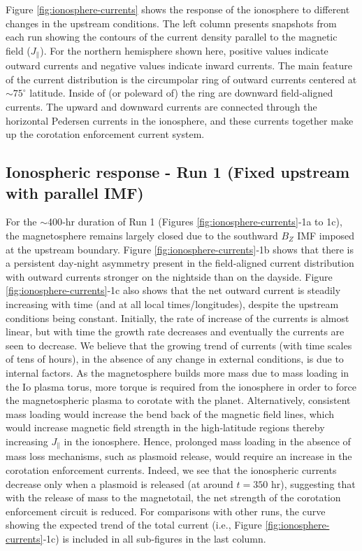 Figure \ref{fig:ionosphere-currents} shows the response of the ionosphere to different changes in the upstream conditions. The left column presents snapshots from each run showing the contours of the current density parallel to the magnetic field ($J_\parallel$). For the northern hemisphere shown here, positive values indicate outward currents and negative values indicate inward currents. The main feature of the current distribution is the circumpolar ring of outward currents centered at $\sim75^\circ$ latitude. Inside of (or poleward of) the ring are downward field‐aligned currents. The upward and downward currents are connected through the horizontal Pedersen currents in the ionosphere, and these currents together make up the corotation enforcement current system. 

\subsection{Ionospheric response - Run 1 (Fixed upstream with parallel IMF)}

For the $\sim$400‐hr duration of Run 1 (Figures \ref{fig:ionosphere-currents}‐1a to 1c), the magnetosphere remains largely closed due to the southward $B_Z$ IMF imposed at the upstream boundary. Figure \ref{fig:ionosphere-currents}‐1b shows that there is a persistent day‐night asymmetry present in the field‐aligned current distribution with outward currents stronger on the nightside than on the dayside. Figure \ref{fig:ionosphere-currents}‐1c also shows that the net outward current is steadily increasing with time (and at all local times/longitudes), despite the upstream conditions being constant. Initially, the rate of increase of the currents is almost linear, but with time the growth rate decreases and eventually the currents are seen to decrease. We believe that the growing trend of currents (with time scales of tens of hours), in the absence of any change in external conditions, is due to internal factors. As the magnetosphere builds more mass due to mass loading in the Io plasma torus, more torque is required from the ionosphere in order to force the magnetospheric plasma to corotate with the planet. Alternatively, consistent mass loading would increase the bend back of the magnetic field lines, which would increase magnetic field strength in the high‐latitude regions thereby increasing $J_\parallel$ in the ionosphere. Hence, prolonged mass loading in the absence of mass loss mechanisms, such as plasmoid release, would require an increase in the corotation enforcement currents. Indeed, we see that the ionospheric currents decrease only when a plasmoid is released (at around $t = 350$ hr), suggesting that with the release of mass to the magnetotail, the net strength of the corotation enforcement circuit is reduced. For comparisons with other runs, the curve showing the expected trend of the total current (i.e., Figure \ref{fig:ionosphere-currents}‐1c) is included in all sub-figures in the last column. 

